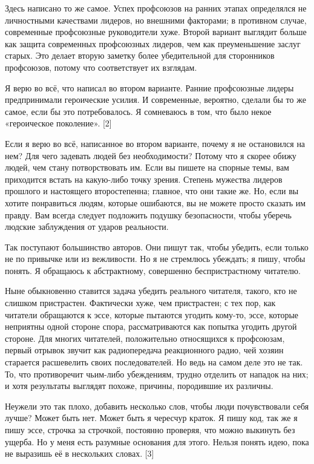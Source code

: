 \documentclass[ebook,12pt,oneside,openany]{memoir}
\begin{document}
Здесь написано то же самое. Успех профсоюзов на ранних этапах
определялся не личностными качествами лидеров, но внешними факторами;
в противном случае, современные профсоюзные руководители хуже. Второй
вариант выглядит больше как защита современных профсоюзных лидеров,
чем как преуменьшение заслуг старых. Это делает вторую заметку более
убедительной для сторонников профсоюзов, потому что соответствует их
взглядам.

Я верю во всё, что написал во втором варианте. Ранние профсоюзные
лидеры предпринимали героические усилия. И современные, вероятно,
сделали бы то же самое, если бы это потребовалось. Я сомневаюсь в том,
что было некое «героическое поколение». [2]

Если я верю во всё, написанное во втором варианте, почему я не
остановился на нем? Для чего задевать людей без необходимости? Потому
что я скорее обижу людей, чем стану потворствовать им. Если вы пишете
на спорные темы, вам приходится встать на какую-либо точку зрения.
Степень мужества лидеров прошлого и настоящего второстепенна; главное,
что они такие же. Но, если вы хотите понравиться людям, которые
ошибаются, вы не можете просто сказать им правду. Вам всегда следует
подложить подушку безопасности, чтобы уберечь людские заблуждения от
ударов реальности.

Так поступают большинство авторов. Они пишут так, чтобы убедить, если
только не по привычке или из вежливости. Но я не стремлюсь убеждать; я
пишу, чтобы понять. Я обращаюсь к абстрактному, совершенно
беспристрастному читателю.

Ныне обыкновенно ставится задача убедить реального читателя, такого,
кто не слишком пристрастен. Фактически хуже, чем пристрастен; с тех
пор, как читатели обращаются к эссе, которые пытаются угодить кому-то,
эссе, которые неприятны одной стороне спора, рассматриваются как
попытка угодить другой стороне. Для многих читателей, положительно
относящихся к профсоюзам, первый отрывок звучит как радиопередача
реакционного радио, чей хозяин старается расшевелить своих
последователей. Но ведь на самом деле это не так. То, что противоречит
чьим-либо убеждениям, трудно отделить от нападок на них; и хотя
результаты выглядят похоже, причины, породившие их различны.

Неужели это так плохо, добавить несколько слов, чтобы люди
почувствовали себя лучше? Может быть нет. Может быть я чересчур
краток. Я пишу код, так же я пишу эссе, строчка за строчкой, постоянно
проверяя, что можно выкинуть без ущерба. Но у меня есть разумные
основания для этого. Нельзя понять идею, пока не выразишь её в
нескольких словах. [3]
\end{document}

